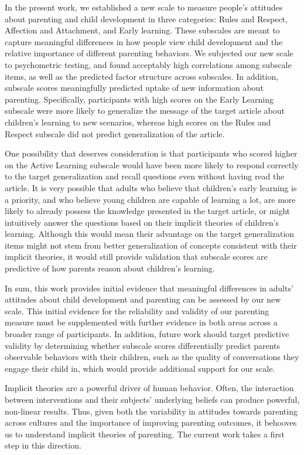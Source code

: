 \documentclass[10pt, letterpaper]{article}
\begin{document}
In the present work, we established a new scale to measure people's
attitudes about parenting and child development in three categories:
Rules and Respect, Affection and Attachment, and Early learning. These
subscales are meant to capture meaningful differences in how people view
child development and the relative importance of different parenting
behaviors. We subjected our new scale to psychometric testing, and found
acceptably high correlations among subscale items, as well as the
predicted factor structure across subscales. In addition, subscale
scores meaningfully predicted uptake of new information about parenting.
Specifically, participants with high scores on the Early Learning
subscale were more likely to generalize the message of the target
article about children's learning to new scenarios, whereas high scores
on the Rules and Respect subscale did not predict generalization of the
article.

One possibility that deserves consideration is that participants who
scored higher on the Active Learning subscale would have been more
likely to respond correctly to the target generalization and recall
questions even without having read the article. It is very possible that
adults who believe that children's early learning is a priority, and who
believe young children are capable of learning a lot, are more likely to
already possess the knowledge presented in the target article, or might
intuitively answer the questions based on their implicit theories of
children's learning. Although this would mean their advantage on the
target generalization items might not stem from better generalization of
concepts consistent with their implicit theories, it would still provide
validation that subscale scores are predictive of how parents reason
about children's learning.

In sum, this work provides initial evidence that meaningful differences
in adults' attitudes about child development and parenting can be
assessed by our new scale. This initial evidence for the reliability and
validity of our parenting measure must be supplemented with further
evidence in both areas across a broader range of participants. In
addition, future work should target predictive validity by determining
whether subscale scores differentially predict parents observable
behaviors with their children, such as the quality of conversations they
engage their child in, which would provide additional support for our
scale.

Implicit theories are a powerful driver of human behavior. Often, the
interaction between interventions and their subjects' underlying beliefs
can produce powerful, non-linear results. Thus, given both the
variability in attitudes towards parenting across cultures and the
importance of improving parenting outcomes, it behooves us to understand
implicit theories of parenting. The current work takes a first step in
this direction.
\end{document}
